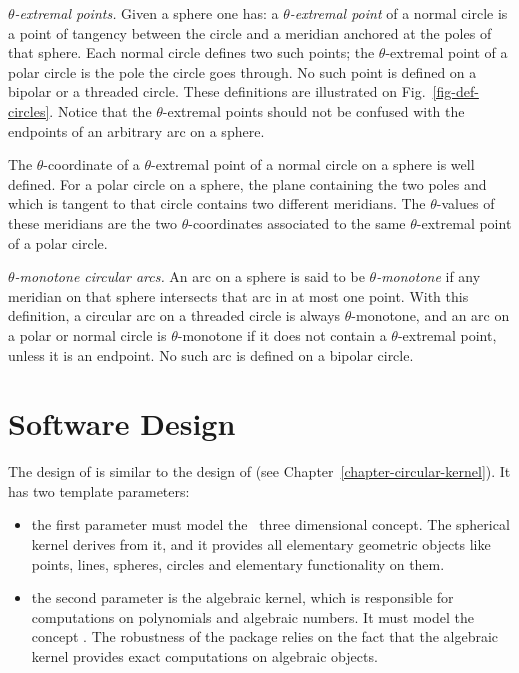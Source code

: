 
\textit{$\theta$-extremal points.}
Given a sphere one has:
a \textit{$\theta$-extremal point} of a normal circle is a point of
tangency between the circle and a meridian anchored at the poles of
that sphere.  Each normal circle defines two such points;
the $\theta$-extremal point of a polar circle is the pole the circle
goes through.  No such point is defined on a bipolar or a threaded
circle. 
These definitions are illustrated on Fig.~\ref{fig-def-circles}.
Notice that the $\theta$-extremal points should not be confused with
the endpoints of an arbitrary arc on a sphere.

The $\theta$-coordinate of a $\theta$-extremal point of a normal
circle on a sphere is well defined.
For a polar circle on a sphere, the plane containing the two poles and which is
tangent to that circle contains two different meridians. The
$\theta$-values of these meridians are the two $\theta$-coordinates
associated to the same $\theta$-extremal point of a polar circle.

\textit{$\theta$-monotone circular arcs.}
An arc on a sphere is said to be \textit{$\theta$-monotone} if any meridian
on that sphere intersects that arc in at most one point. With this definition, a
circular arc on a threaded circle is always $\theta$-monotone, and an
arc on a polar or normal circle is $\theta$-monotone if it does not
contain a $\theta$-extremal point, unless it is an endpoint. No such
arc is defined on a bipolar circle.

\section{Software Design}

The design of  is similar to the design of
 (see Chapter~\ref{chapter-circular-kernel}). 
It has two template parameters:
\begin{itemize}
\item {} the first parameter must model the \cgal\ 
three dimensional  concept. The spherical kernel derives
from it, and it provides all elementary geometric objects like points,
lines, spheres, circles and elementary functionality on them.
\item {} the second parameter is the algebraic kernel, which is 
responsible for computations on polynomials and algebraic numbers. It 
must model the concept \ccc{AlgebraicKernelForSpheres}. The
robustness of the package relies on the fact that the algebraic kernel
provides exact computations on algebraic objects.
\end{itemize}

